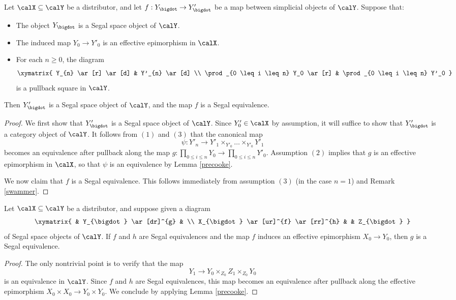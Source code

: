 \begin{lemma}\label{cooke}
Let $\calX \subseteq \calY$ be a distributor, and let $f: Y_{\bigdot} \rightarrow Y'_{\bigdot}$ be
a map between simplicial objects of $\calY$. Suppose that:
\begin{itemize}
\item[$(1)$] The object $Y_{\bigdot}$ is a Segal space object of $\calY$.
\item[$(2)$] The induced map $Y_0 \rightarrow Y'_0$ is an effective epimorphism in $\calX$.
\item[$(3)$] For each $n \geq 0$, the diagram
$$ \xymatrix{ Y_{n} \ar[r] \ar[d] & Y'_{n} \ar[d] \\
\prod_{0 \leq i \leq n} Y_0 \ar[r] & \prod_{0 \leq i \leq n} Y'_0 }$$
is a pullback square in $\calY$.
\end{itemize}
Then $Y'_{\bigdot}$ is a Segal space object of $\calY$, and the map $f$ is a Segal equivalence.
\end{lemma}

\begin{proof}
We first show that $Y'_{\bigdot}$ is a Segal space object of $\calY$.
Since $Y'_0 \in \calX$ by assumption, it will suffice to show that $Y'_{\bigdot}$ is a category
object of $\calY$. It follows from $(1)$ and $(3)$ that the canonical map
$$ \psi: Y'_{n} \rightarrow Y'_1 \times_{ Y'_0} \ldots \times_{ Y'_0} Y'_1$$
becomes an equivalence after pullback along the map $g: \prod_{ 0 \leq i \leq n} Y_0 \rightarrow
\prod_{0 \leq i \leq n} Y'_0$. Assumption $(2)$ implies that $g$ is an effective epimorphism in $\calX$, so that $\psi$ is an equivalence by Lemma \ref{precooke}.

We now claim that $f$ is a Segal equivalence. This follows immediately from assumption $(3)$
(in the case $n=1$) and Remark \ref{swammer}.
\end{proof}

\begin{lemma}\label{sowork}
Let $\calX \subseteq \calY$ be a distributor, and suppose given a diagram
$$ \xymatrix{ & Y_{\bigdot} \ar[dr]^{g}  & \\
X_{\bigdot} \ar[ur]^{f} \ar[rr]^{h} & & Z_{\bigdot} }$$
of Segal space objects of $\calY$. If $f$ and $h$ are Segal equivalences and the map
$f$ induces an effective epimorphism $X_0 \rightarrow Y_0$, then $g$ is a Segal equivalence.
\end{lemma}

\begin{proof}
The only nontrivial point is to verify that the map
$$ Y_1 \rightarrow Y_0 \times_{ Z_0} Z_1 \times_{ Z_0} Y_0$$
is an equivalence in $\calY$. Since $f$ and $h$ are Segal equivalences, this map becomes
an equivalence after pullback along the effective epimorphism $X_0 \times X_0 \rightarrow Y_0 \times Y_0$. We conclude by applying Lemma \ref{precooke}.
\end{proof}

